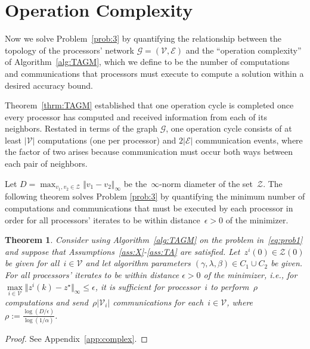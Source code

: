 \documentclass[9pt,shortpaper,twoside,web]{ieeecolor}
\newcommand{\X}{\ensuremath{\mathcal{X}}\xspace}
\newcommand{\Z}{\ensuremath{\mathcal{Z}}\xspace}
\newcommand{\V}{\ensuremath{\mathcal{V}}\xspace}
\newcommand{\G}{\ensuremath{\mathcal{G}}\xspace}
\newcommand{\E}{\ensuremath{\mathcal{E}}\xspace}
\newcommand{\blue}[1]{{\textcolor{blue}{#1}}}
\newtheorem{theorem}{Theorem}
\begin{document}
\section{Operation Complexity}
Now we solve Problem~\ref{prob:3} by quantifying the relationship between the 
topology of the processors' network $\G=(\V,\E)$ and the ``operation complexity'' of Algorithm~\ref{alg:TAGM},
which we define to be the number of computations and communications that processors must
execute to compute a solution within a desired accuracy bound. 

Theorem~\ref{thrm:TAGM} established that 
one operation cycle is completed once every processor has 
computed and received information from each of its neighbors. 
Restated in terms of the graph $\G$, one operation cycle consists of at least $\vert \V\vert$ computations 
(one per processor)
and $2\vert \E\vert$ communication events, 
where the factor of two arises because communication must occur both ways
between each pair of neighbors. 

Let $D = \max_{v_1,v_2\in\Z}\Vert v_1-v_2\Vert_\infty$ be the~$\infty$-norm diameter
of the set~$\Z$. 
The following theorem solves Problem \ref{prob:3} by quantifying the minimum number of computations and communications that must be executed by each processor in order for all processors' iterates to be within distance~$\epsilon > 0$ of the minimizer.

\begin{theorem}\label{thrm:opcomplex}
    Consider using Algorithm~\ref{alg:TAGM} on the problem in~\eqref{eq:prob1} and 
    suppose that Assumptions~\ref{ass:X}-\ref{ass:TA} are satisfied.
    Let~$z^i(0) \in \Z(0)$ be given for all~$i \in \V$ and let
    algorithm parameters $(\gamma,\lambda,\beta)\in C_1 \cup C_2$ be given. 
    For all processors' iterates to be within distance $\epsilon > 0$ of the minimizer, i.e., for~$\max\limits_{i\in\V}\Vert z^i(k)-z^\star\Vert_\infty\leq \epsilon$, 
    it is sufficient for processor~$i$ to perform~$\rho$ 
    computations and send~$\rho\vert \V_i\vert$ communications
    for each~$i \in \V$, where $\rho :=\frac{\log (D/\epsilon)}{\log(1/\alpha)}$. 
\end{theorem}
\begin{proof}
    See Appendix~\ref{app:complex}. 
\end{proof}
\end{document}
